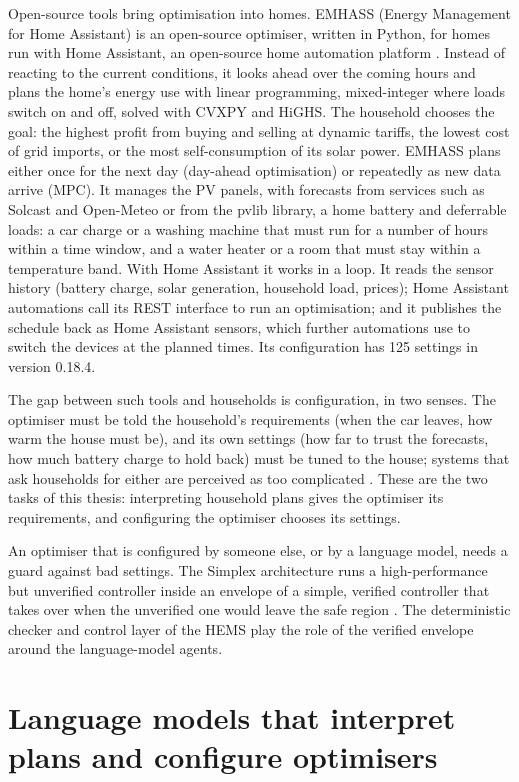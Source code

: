 Open-source tools bring optimisation into homes. EMHASS (Energy
Management for Home Assistant) is an open-source optimiser, written in
Python, for homes run with Home Assistant, an open-source home
automation platform \parencite{emhass}. Instead of reacting to the
current conditions, it looks ahead over the coming hours and plans the
home's energy use with linear programming, mixed-integer where loads
switch on and off, solved with CVXPY and HiGHS. The household chooses
the goal: the highest profit from buying and selling at dynamic
tariffs, the lowest cost of grid imports, or the most self-consumption
of its solar power. EMHASS plans either once for the next day
(day-ahead optimisation) or repeatedly as new data arrive (MPC). It
manages the PV panels, with forecasts from services such as Solcast
and Open-Meteo or from the pvlib library, a home battery and
deferrable loads: a car charge or a washing machine that must run for
a number of hours within a time window, and a water heater or a room
that must stay within a temperature band. With Home Assistant it works
in a loop. It reads the sensor history (battery charge, solar
generation, household load, prices); Home Assistant automations call
its REST interface to run an optimisation; and it publishes the
schedule back as Home Assistant sensors, which further automations use
to switch the devices at the planned times. Its configuration has 125
settings in version 0.18.4.

The gap between such tools and households is
configuration, in two senses. The optimiser must be told the household's
requirements (when the car leaves, how warm the house must be), and its
own settings (how far to trust the forecasts, how much battery charge
to hold back) must be tuned to the house; systems that ask households
for either are perceived as too complicated \parencite{tuomela2021}.
These are the two tasks of this thesis: interpreting household plans
gives the optimiser its requirements, and configuring the optimiser
chooses its settings.

An optimiser that is configured by someone else, or by a language model,
needs a guard against bad settings. The Simplex architecture runs a
high-performance but unverified controller inside an envelope of a
simple, verified controller that takes over when the unverified one
would leave the safe region \parencite{sha2001}. The deterministic
checker and control layer of the HEMS play the role of the verified
envelope around the language-model agents.

\section{Language models that interpret plans and configure optimisers}
\label{sec:litlm}

